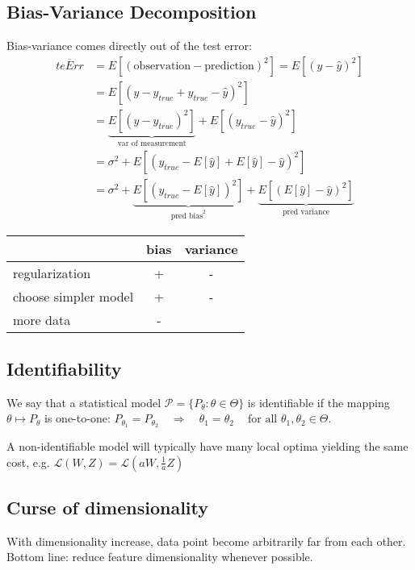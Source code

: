 \documentclass[10pt,a4paper,landscape]{article}
\begin{document}
\begin{multicols*}{4}
\subsection{Bias-Variance Decomposition}

Bias-variance comes directly out of the test error:
 \begin{align*}
 \overline{teErr}
 &= E[(\text{observation} - \text{prediction})^2] = E[(y - \hat{y})^2] \\
 &= E[(y - y_{true} + y_{true} - \hat{y})^2] \\
 &=\underbrace{E[(y - y_{true})^2]}_{\text{var of measurement}} + E[(y_{true} - \hat{y})^2] \\
 &=\sigma^2 + E[(y_{true} - E[\hat{y}] + E[\hat{y}] - \hat{y})^2] \\
 &=\sigma^2 + \underbrace{E[(y_{true} - E[\hat{y}])^2]}_{\text{pred bias}^2} +\underbrace{E[(E[\hat{y}] - \hat{y})^2]}_{\text{pred variance}}
\end{align*}

\begin{tabular}{ l || c | c }
                          & bias & variance \\
  \hline
  regularization          & +    & - \\
  choose simpler model    & +    & - \\
  more data               & -    & \\
  \hline
\end{tabular}

\subsection{Identifiability}
We say that a statistical model $\mathcal{P} = \{P_\theta: \theta \in \Theta\}$ is identifiable if the mapping $\theta \mapsto P_\theta$ is one-to-one:
$P_{\theta_1}=P_{\theta_2} \quad\Rightarrow\quad \theta_1=\theta_2 \quad\ \text{for all } \theta_1,\theta_2\in\Theta.$

A non-identifiable model will typically have many local optima yielding the same cost, e.g. $\mathcal{L}(W, Z) = \mathcal{L}(aW, \frac{1}{a} Z)$

\subsection{Curse of dimensionality}
With dimensionality increase, data point become arbitrarily far from each other. %
Bottom line: reduce feature dimensionality whenever possible.


\end{multicols*}
\end{document}

